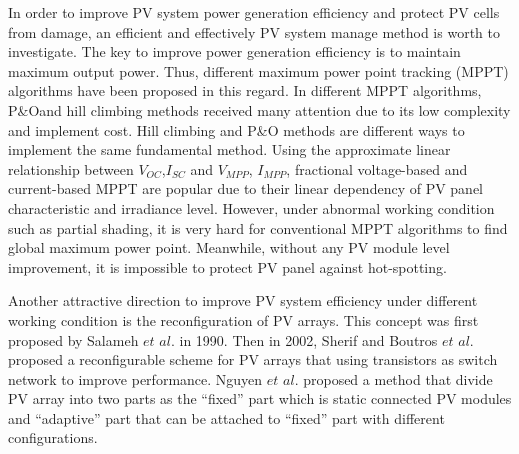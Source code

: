 \documentclass[journal]{IEEEtran}
\begin{document}
In order to improve PV system power generation efficiency and protect PV cells from damage, an efficient and effectively PV system manage method is worth to investigate.
The key to improve power generation efficiency is to maintain maximum output power.
Thus, different maximum power point tracking (MPPT) algorithms have been proposed in this regard.
In different MPPT algorithms, P\&O\cite{kasa2000maximum,jain2004new,chomsuwan2002photovoltaic,wasynezuk1983dynamic}and hill climbing\cite{koutroulis2001development,teulings1993new,xiao2004modified} methods received many attention due to its low complexity and implement cost.
Hill climbing and P\&O methods are different ways to implement the same fundamental method.
Using the approximate linear relationship between $V_{OC}$,$I_{SC}$ and $V_{MPP}$, $I_{MPP}$, fractional voltage-based and current-based MPPT are popular due to their linear dependency of PV panel characteristic and irradiance level\cite{Liu2016,kobayashi2004novel,bekker2004finding,mutoh2002prediction,noguchi2001short}.
However, under abnormal working condition such as partial shading, it is very hard for conventional MPPT algorithms to find global maximum power point.
Meanwhile, without any PV module level improvement, it is impossible to protect PV panel against hot-spotting\cite{Olalla2018,ghanbari2016permanent}.

Another attractive direction to improve PV system efficiency under different working condition is the reconfiguration of PV arrays.
This concept was first proposed by Salameh $et$ $al.$\cite{Salameh1990} in 1990.
Then in 2002, Sherif and Boutros $et$ $al.$ proposed a reconfigurable scheme for PV arrays that using transistors as switch network to improve performance\cite{sherif2002solar}.
Nguyen $et$ $al.$ proposed a method that divide PV array into two parts as the ``fixed'' part which is static connected PV modules and ``adaptive'' part that can be attached to ``fixed'' part with different configurations\cite{Nguyen2008}.
\end{document}
